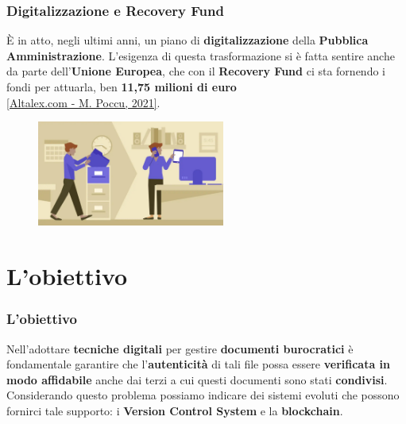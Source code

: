 \documentclass{beamer}
\begin{document}
\begin{frame}
	\frametitle{Digitalizzazione e Recovery Fund}
	È in atto, negli ultimi anni, un piano di \textbf{digitalizzazione} della \textbf{Pubblica Amministrazione}.
	L'esigenza di questa trasformazione si è fatta sentire anche da parte
	dell'\textbf{Unione Europea}, che con il \textbf{Recovery Fund}
	ci sta fornendo i fondi per attuarla, ben \textbf{11,75 milioni di euro} \\ \href{https://www.altalex.com/documents/news/2021/05/06/transizione-digitale-pubblica-amministrazione}{[Altalex.com - M. Poccu, 2021]}.
	\medskip
	\begin{figure}
		\includegraphics[width=0.55\textwidth]{digitalizzazione.jpg}
	\end{figure}
\end{frame}

\section{L'obiettivo}
\begin{frame}
	\frametitle{L'obiettivo}
	Nell'adottare \textbf{tecniche digitali} per gestire \textbf{documenti burocratici} è fondamentale
	garantire che l'\textbf{autenticità} di tali file possa essere \textbf{verificata in modo affidabile}
	anche dai terzi a cui questi documenti sono stati \textbf{condivisi}.\\
	Considerando questo problema possiamo indicare dei sistemi evoluti che possono
	fornirci tale supporto: i \textbf{Version Control System} e la \textbf{blockchain}.
\end{frame}

\end{document}

